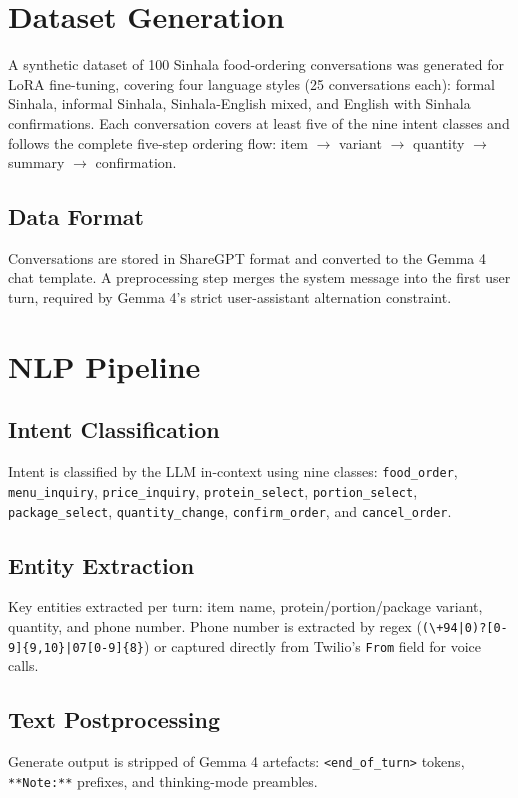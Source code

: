 \documentclass[12pt,a4paper]{report}
\begin{document}
\section{Dataset Generation}
A synthetic dataset of 100 Sinhala food-ordering conversations was generated for LoRA fine-tuning, covering four language styles (25 conversations each): formal Sinhala, informal Sinhala, Sinhala-English mixed, and English with Sinhala confirmations. Each conversation covers at least five of the nine intent classes and follows the complete five-step ordering flow: item $\rightarrow$ variant $\rightarrow$ quantity $\rightarrow$ summary $\rightarrow$ confirmation.

\subsection{Data Format}
Conversations are stored in ShareGPT format and converted to the Gemma 4 chat template. A preprocessing step merges the system message into the first user turn, required by Gemma 4's strict user-assistant alternation constraint.

\section{NLP Pipeline}

\subsection{Intent Classification}
Intent is classified by the LLM in-context using nine classes: \texttt{food\_order}, \texttt{menu\_inquiry}, \texttt{price\_inquiry}, \texttt{protein\_select}, \texttt{portion\_select}, \texttt{package\_select}, \texttt{quantity\_change}, \texttt{confirm\_order}, and \texttt{cancel\_order}.

\subsection{Entity Extraction}
Key entities extracted per turn: item name, protein/portion/package variant, quantity, and phone number. Phone number is extracted by regex (\texttt{(\textbackslash+94|0)?[0-9]\{9,10\}|07[0-9]\{8\}}) or captured directly from Twilio's \texttt{From} field for voice calls.

\subsection{Text Postprocessing}
Generate output is stripped of Gemma 4 artefacts: \texttt{<end\_of\_turn>} tokens, \texttt{**Note:**} prefixes, and thinking-mode preambles.
\end{document}

